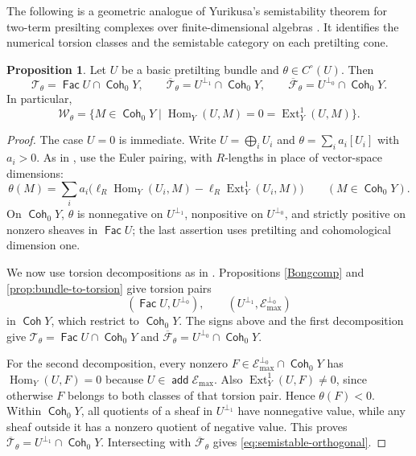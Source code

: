 \documentclass[a4paper,reqno]{amsart}
\def\E{\mathcal{E}}
\def\F{\mathcal{F}}
\def\T{\mathcal{T}}
\def\W{\mathcal{W}}
\DeclareMathOperator{\add}{\mathsf{add}}
\DeclareMathOperator{\Fac}{\mathsf{Fac}}
\DeclareMathOperator{\Coh}{\mathsf{Coh}}
\DeclareMathOperator{\Hom}{Hom}
\DeclareMathOperator{\Ext}{Ext}
\theoremstyle{definition}
\newtheorem{Prop}[Thm]{Proposition}
\begin{document}
The following is a geometric analogue of Yurikusa's semistability theorem for two-term presilting complexes over finite-dimensional algebras \cite[Theorem 1.4 and Proposition 3.3]{Yur18}. It identifies the numerical torsion classes and the semistable category on each pretilting cone.

\begin{Prop}\label{prop:pretilting-numerical-classes}
Let $U$ be a basic pretilting bundle and $\theta\in C^\circ(U)$. Then
\begin{equation}\label{eq:pretilting-numerical-classes}
\T_\theta=\Fac U\cap\Coh_0Y,
\qquad \overline{\T}_\theta=U^{\perp_1}\cap\Coh_0Y,
\qquad \overline{\F}_\theta=U^{\perp_0}\cap\Coh_0Y.
\end{equation}
In particular,
\begin{equation}\label{eq:semistable-orthogonal}
\W_\theta=\{M\in\Coh_0Y\mid\Hom_Y(U,M)=0=\Ext_Y^1(U,M)\}.
\end{equation}
\end{Prop}
\begin{proof}
The case $U=0$ is immediate. Write $U=\bigoplus_iU_i$ and $\theta=\sum_i a_i[U_i]$ with $a_i>0$. As in \cite[Proposition 3.3]{Yur18}, use the Euler pairing, with $R$-lengths in place of vector-space dimensions:
\[
\theta(M)=\sum_i a_i\bigl(
\ell_R\Hom_Y(U_i,M)-\ell_R\Ext_Y^1(U_i,M)\bigr)
\qquad(M\in\Coh_0Y).
\]
On $\Coh_0Y$, $\theta$ is nonnegative on $U^{\perp_1}$, nonpositive on $U^{\perp_0}$, and strictly positive on nonzero sheaves in $\Fac U$; the last assertion uses pretilting and cohomological dimension one.

We now use torsion decompositions as in \cite[proof of Theorem 1.4]{Yur18}. Propositions \ref{Bongcomp} and \ref{prop:bundle-to-torsion} give torsion pairs
\[
(\Fac U,U^{\perp_0}),
\qquad (U^{\perp_1},\E_{\max}^{\perp_0})
\]
in $\Coh Y$, which restrict to $\Coh_0Y$. The signs above and the first decomposition give $\T_\theta=\Fac U\cap\Coh_0Y$ and $\overline{\F}_\theta=U^{\perp_0}\cap\Coh_0Y$.

For the second decomposition, every nonzero $F\in\E_{\max}^{\perp_0}\cap\Coh_0Y$ has $\Hom_Y(U,F)=0$ because $U\in\add\E_{\max}$. Also $\Ext_Y^1(U,F)\ne0$, since otherwise $F$ belongs to both classes of that torsion pair. Hence $\theta(F)<0$. Within $\Coh_0Y$, all quotients of a sheaf in $U^{\perp_1}$ have nonnegative value, while any sheaf outside it has a nonzero quotient of negative value. This proves $\overline{\T}_\theta=U^{\perp_1}\cap\Coh_0Y$. Intersecting with $\overline{\F}_\theta$ gives \eqref{eq:semistable-orthogonal}.
\end{proof}
\end{document}
